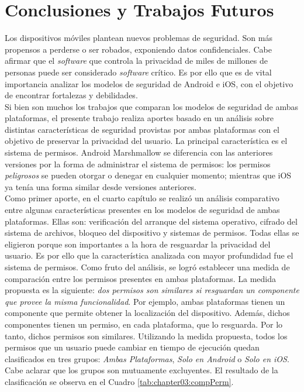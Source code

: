 \chapter{Conclusiones y Trabajos Futuros}
Los dispositivos móviles plantean nuevos problemas de seguridad. Son más propensos a perderse o ser robados, exponiendo datos confidenciales. Cabe afirmar que el \emph{software} que controla la privacidad de miles de millones de personas puede ser considerado \emph{software} crítico. Es por ello que es de vital importancia analizar los modelos de seguridad de Android e iOS, con el objetivo de encontrar fortalezas y debilidades.\\

Si bien son muchos los trabajos que comparan los modelos de seguridad de ambas plataformas, el presente trabajo realiza aportes basado en un análisis sobre distintas características de seguridad provistas por ambas plataformas con el objetivo de preservar la privacidad del usuario. La principal característica es el sistema de permisos. Android Marshmallow se diferencia con las anteriores versiones por la forma de administrar el sistema de permisos: los permisos \emph{peligrosos} se pueden otorgar o denegar en cualquier momento; mientras que iOS ya tenía una forma similar desde versiones anteriores.\\

Como primer aporte, en el cuarto capítulo se realizó un análisis comparativo entre algunas características presentes en los modelos de seguridad de ambas plataformas. Ellas son: verificación del arranque del sistema operativo, cifrado del sistema de archivos, bloqueo del dispositivo y sistemas de permisos. Todas ellas se eligieron porque son importantes a la hora de resguardar la privacidad del usuario. Es por ello que la característica analizada con mayor profundidad fue el sistema de permisos. Como fruto del análisis, se logró establecer una medida de comparación entre los permisos presentes en ambas plataformas. La medida propuesta es la siguiente: \emph{dos permisos son similares si resguardan un componente que provee la misma funcionalidad}. Por ejemplo, ambas plataformas tienen un componente que permite obtener la localización del dispositivo. Además, dichos componentes tienen un permiso, en cada plataforma, que lo resguarda. Por lo tanto, dichos permisos son similares. Utilizando la medida propuesta, todos los permisos que un usuario puede cambiar en tiempo de ejecución quedan clasificados en tres grupos: \emph{Ambas Plataformas}, \emph{Solo en Android} o \emph{Solo en iOS}. Cabe aclarar que los grupos son mutuamente excluyentes. El resultado de la clasificación se observa en el Cuadro \ref{tab:chapter03:compPerm}.\\ 

